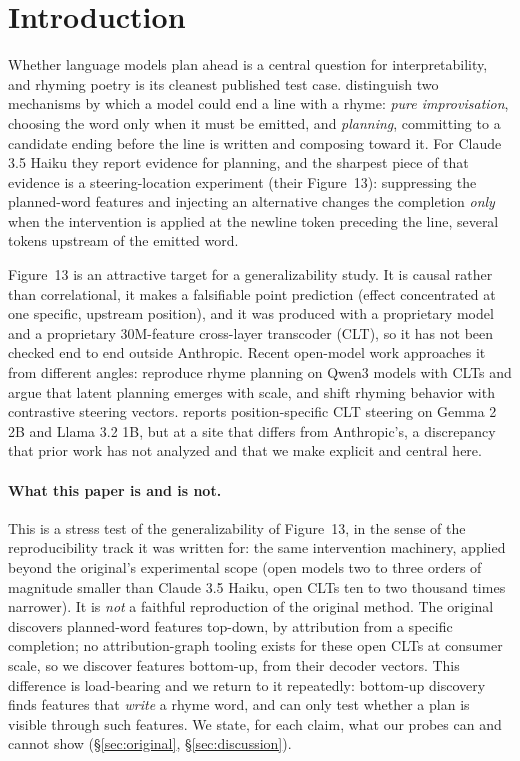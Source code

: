 \documentclass[11pt]{article}
\begin{document}
\section{Introduction}

Whether language models plan ahead is a central question for interpretability, and rhyming poetry is its cleanest published test case. \citet{lindsey2025biology} distinguish two mechanisms by which a model could end a line with a rhyme: \emph{pure improvisation}, choosing the word only when it must be emitted, and \emph{planning}, committing to a candidate ending before the line is written and composing toward it. For Claude 3.5 Haiku they report evidence for planning, and the sharpest piece of that evidence is a steering-location experiment (their Figure~13): suppressing the planned-word features and injecting an alternative changes the completion \emph{only} when the intervention is applied at the newline token preceding the line, several tokens upstream of the emitted word.

Figure~13 is an attractive target for a generalizability study. It is causal rather than correlational, it makes a falsifiable point prediction (effect concentrated at one specific, upstream position), and it was produced with a proprietary model and a proprietary 30M-feature cross-layer transcoder (CLT), so it has not been checked end to end outside Anthropic. Recent open-model work approaches it from different angles: \citet{hanna2026latent} reproduce rhyme planning on Qwen3 models with CLTs and argue that latent planning emerges with scale, and \citet{maar2026plan} shift rhyming behavior with contrastive steering vectors. \citet{jacopin2026prolepsis} reports position-specific CLT steering on Gemma 2 2B and Llama 3.2 1B, but at a site that differs from Anthropic's, a discrepancy that prior work has not analyzed and that we make explicit and central here.

\paragraph{What this paper is and is not.}
This is a stress test of the generalizability of Figure~13, in the sense of the reproducibility track it was written for: the same intervention machinery, applied beyond the original's experimental scope (open models two to three orders of magnitude smaller than Claude 3.5 Haiku, open CLTs ten to two thousand times narrower). It is \emph{not} a faithful reproduction of the original method. The original discovers planned-word features top-down, by attribution from a specific completion; no attribution-graph tooling exists for these open CLTs at consumer scale, so we discover features bottom-up, from their decoder vectors. This difference is load-bearing and we return to it repeatedly: bottom-up discovery finds features that \emph{write} a rhyme word, and can only test whether a plan is visible through such features. We state, for each claim, what our probes can and cannot show (\S\ref{sec:original}, \S\ref{sec:discussion}).
\end{document}
